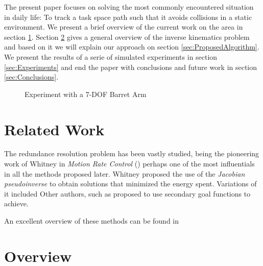 \documentclass[conference]{IEEEtran}
\begin{document}
The present paper focuses on solving the most commonly encountered
situation in daily life: To track a task space path
such that it avoids collisions in a static
environment. We present a brief overview of the current work on the area in section 
\ref{sec:RelatedWork}. Section \ref{sec:Overview} gives a general overview of
the inverse kinematics problem and based on it we will explain our
approach on section \ref{sec:ProposedAlgorithm}. We present the 
results of a serie of simulated experiments in section \ref{sec:Experiments}
and end the paper with conclusions and future work in section \ref{sec:Conclusions}.

\begin{figure}[]
  \centering
  \caption{ Experiment with a 7-DOF Barret Arm}
  \label{fig:CoverFigure}
\end{figure}


\section{Related Work}
\label{sec:RelatedWork}
The redundance resolution problem has been vastly studied, being the
pioneering work of Whitney in \emph{Motion Rate Control} (\cite{Whitney-motionRate-1969}) perhaps one of the most influentials in all the methods proposed later. 
Whitney proposed the use of the \emph{Jacobian pseudoinverse} to obtain
solutions that minimized the energy spent. Variations of it included   
Other authors, such as \cite{liegeois-ns-1977} proposed to use
secondary goal functions to achieve.

An excellent overview of these methods can be found in \cite{siciliano-ns-1990}

\section{Overview}
\label{sec:Overview}
\end{document}
